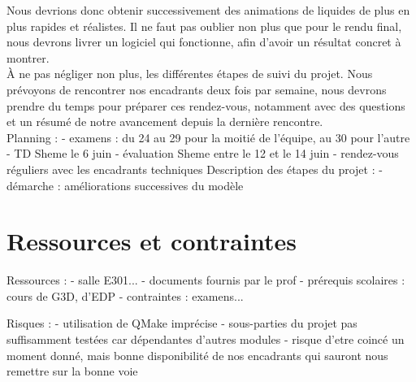 \documentclass[a4paper,10pt]{article}
\begin{document}
Nous devrions donc obtenir successivement des animations de liquides de plus en plus rapides et réalistes. Il ne faut pas oublier non plus que pour le rendu final, nous devrons livrer un logiciel qui fonctionne, afin d'avoir un résultat concret à montrer.\\

À ne pas négliger non plus, les différentes étapes de suivi du projet. Nous prévoyons de rencontrer nos encadrants deux fois par semaine, nous devrons prendre du temps pour préparer ces rendez-vous, notamment avec des questions et un résumé de notre avancement depuis la dernière rencontre. \\

Planning :
- examens : du 24 au 29 pour la moitié de l'équipe, au 30 pour l'autre
- TD Sheme le 6 juin
- évaluation Sheme entre le 12 et le 14 juin
- rendez-vous réguliers avec les encadrants techniques
Description des étapes du projet :
- démarche : améliorations successives du modèle

\section{Ressources et contraintes}

Ressources :
- salle E301...
- documents fournis par le prof
- prérequis scolaires : cours de G3D, d'EDP
- contraintes : examens...

Risques :
- utilisation de QMake imprécise
- sous-parties du projet pas suffisamment testées car dépendantes d'autres modules
- risque d'etre coincé un moment donné, mais bonne disponibilité de nos encadrants qui sauront nous remettre sur la bonne voie
\end{document}
